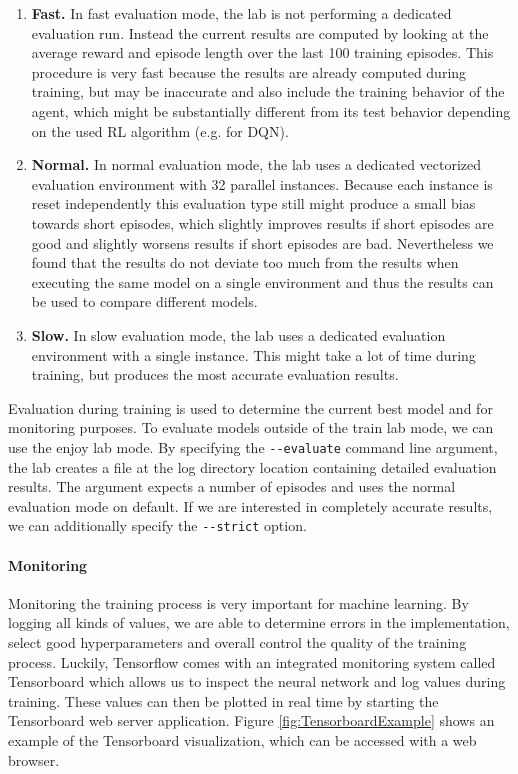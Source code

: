 \begin{enumerate}
    \item \textbf{Fast.} In fast evaluation mode, the lab is not performing a dedicated evaluation run. Instead the current results are computed by looking at the average reward and episode length over the last 100 training episodes. This procedure is very fast because the results are already computed during training, but may be inaccurate and also include the training behavior of the agent, which might be substantially different from its test behavior depending on the used RL algorithm (e.g. for DQN).
    \item \textbf{Normal.} In normal evaluation mode, the lab uses a dedicated vectorized evaluation environment with 32 parallel instances. Because each instance is reset independently this evaluation type still might produce a small bias towards short episodes, which slightly improves results if short episodes are good and slightly worsens results if short episodes are bad. Nevertheless we found that the results do not deviate too much from the results when executing the same model on a single environment and thus the results can be used to compare different models.
    \item \textbf{Slow.} In slow evaluation mode, the lab uses a dedicated evaluation environment with a single instance. This might take a lot of time during training, but produces the most accurate evaluation results. 
\end{enumerate}

Evaluation during training is used to determine the current best model and for monitoring purposes. To evaluate models outside of the train lab mode, we can use the enjoy lab mode. By specifying the \texttt{-{}-evaluate} command line argument, the lab creates a file at the log directory location containing detailed evaluation results. The argument expects a number of episodes and uses the normal evaluation mode on default. If we are interested in completely accurate results, we can additionally specify the \texttt{-{}-strict} option. 

\paragraph{Monitoring}
Monitoring the training process is very important for machine learning. By logging all kinds of values, we are able to determine errors in the implementation, select good hyperparameters and overall control the quality of the training process. Luckily, Tensorflow comes with an integrated monitoring system called Tensorboard which allows us to inspect the neural network and log values during training. These values can then be plotted in real time by starting the Tensorboard web server application. Figure \ref{fig:TensorboardExample} shows an example of the Tensorboard visualization, which can be accessed with a web browser.

